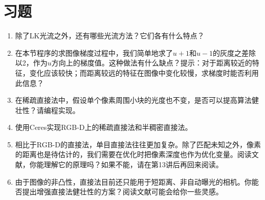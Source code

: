 \section*{习题}
\begin{enumerate}
	\item 除了LK光流之外，还有哪些光流方法？它们各有什么特点？
	\item 在本节程序的求图像梯度过程中，我们简单地求了$u+1$和$u-1$的灰度之差除以2，作为$u$方向上的梯度值。这种做法有什么缺点？提示：对于距离较近的特征，变化应该较快；而距离较远的特征在图像中变化较慢，求梯度时能否利用此信息？
	\item 在稀疏直接法中，假设单个像素周围小块的光度也不变，是否可以提高算法健壮性？请编程实现。
	\item[\optional] 使用Ceres实现RGB-D上的稀疏直接法和半稠密直接法。
	\item 相比于RGB-D的直接法，单目直接法往往更加复杂。除了匹配未知之外，像素的距离也是待估计的，我们需要在优化时把像素深度也作为优化变量。阅读文献\cite{Engel2013, Engel2014}，你能理解它的原理吗？如果不能，请在第13讲后再回来阅读。
	\item 由于图像的非凸性，直接法目前还只能用于短距离、非自动曝光的相机。你能否提出增强直接法健壮性的方案？阅读文献\cite{Engel2016, Usenko2016}可能会给你一些灵感。
\end{enumerate}


